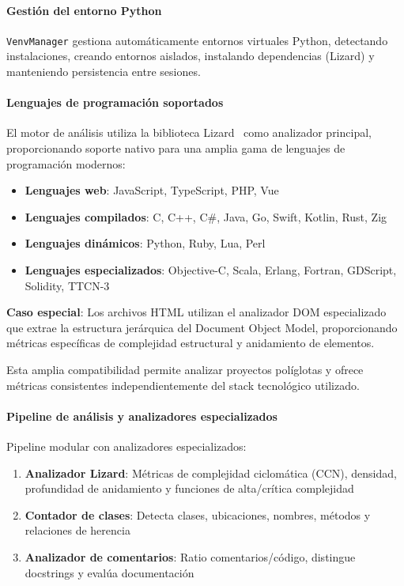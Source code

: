 \documentclass[a4paper, 12pt]{book}
\begin{document}

\paragraph{Gestión del entorno Python}
\texttt{VenvManager} gestiona automáticamente entornos virtuales Python, detectando instalaciones, creando entornos aislados, instalando dependencias (Lizard) y manteniendo persistencia entre sesiones.

\paragraph{Lenguajes de programación soportados}
El motor de análisis utiliza la biblioteca Lizard~\cite{lizard} como analizador principal, proporcionando soporte nativo para una amplia gama de lenguajes de programación modernos:

\begin{itemize}
  \item \textbf{Lenguajes web}: JavaScript, TypeScript, PHP, Vue
  \item \textbf{Lenguajes compilados}: C, C++, C\#, Java, Go, Swift, Kotlin, Rust, Zig
  \item \textbf{Lenguajes dinámicos}: Python, Ruby, Lua, Perl
  \item \textbf{Lenguajes especializados}: Objective-C, Scala, Erlang, Fortran, GDScript, Solidity, TTCN-3
\end{itemize}

\textbf{Caso especial}: Los archivos HTML utilizan el analizador DOM especializado que extrae la estructura jerárquica del Document Object Model, proporcionando métricas específicas de complejidad estructural y anidamiento de elementos.

Esta amplia compatibilidad permite analizar proyectos políglotas y ofrece métricas consistentes independientemente del stack tecnológico utilizado.

\paragraph{Pipeline de análisis y analizadores especializados}
Pipeline modular con analizadores especializados:

\begin{enumerate}
  \item \textbf{Analizador Lizard}: Métricas de complejidad ciclomática (CCN), densidad, profundidad de anidamiento y funciones de alta/crítica complejidad
  \item \textbf{Contador de clases}: Detecta clases, ubicaciones, nombres, métodos y relaciones de herencia
  \item \textbf{Analizador de comentarios}: Ratio comentarios/código, distingue docstrings y evalúa documentación
\end{enumerate}
\end{document}
